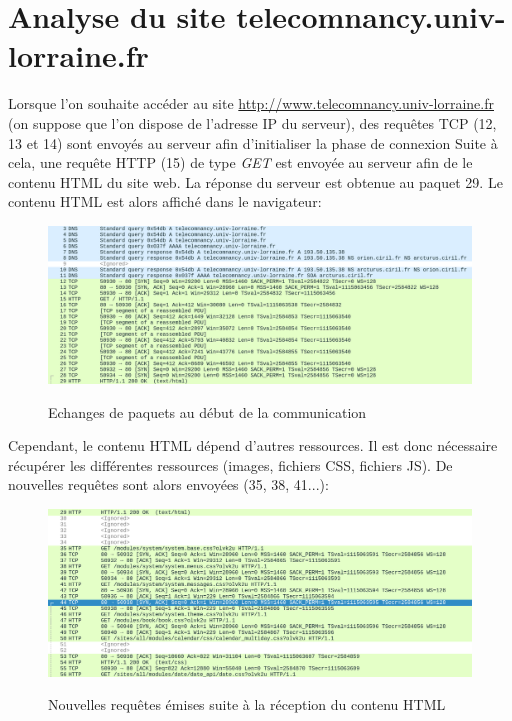 \documentclass[a4paper,11pt, oneside]{book}
\def\widthImage{1}
\begin{document}
		\section{Analyse du site telecomnancy.univ-lorraine.fr}

		Lorsque l'on souhaite accéder au site \href{http://www.telecomnancy.univ-lorraine.fr}{http://www.telecomnancy.univ-lorraine.fr} (on suppose que l'on dispose de l'adresse
		IP du serveur), des requêtes TCP (12, 13 et 14) sont envoyés au serveur afin d'initialiser la phase de connexion
		Suite à cela, une requête HTTP (15) de type \textit{GET} est envoyée au serveur afin de le contenu HTML du site web. La réponse du serveur est
		obtenue au paquet 29. Le contenu HTML est alors affiché dans le navigateur:

		\begin{figure} [htbp]
			\centering
			\includegraphics[width=\widthImage\textwidth]{1.png}\\
			\caption{Echanges de paquets au début de la communication}
		\end{figure}

		\noindent Cependant, le contenu HTML dépend d'autres ressources. Il est donc nécessaire
		récupérer les différentes ressources (images, fichiers CSS, fichiers JS). De nouvelles requêtes sont alors envoyées (35, 38, 41...):

		\begin{figure} [htbp]
			\centering
			\includegraphics[width=\widthImage\textwidth]{2.png}\\
			\caption{Nouvelles requêtes émises suite à la réception du contenu HTML}
		\end{figure}
\end{document}
